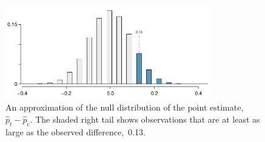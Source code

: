 




\begin{figure}[ht]
\centering
\includegraphics[width=0.8\textwidth]{02/figures/CPR_study/CPR_study_right_tail}
\caption{An approximation of the null distribution of the point estimate, $\hat{p}_t - \hat{p}_c$. The shaded right tail shows observations that are at least as large as the observed difference,~0.13.}
\label{CPR_study_right_tail}
\end{figure}

